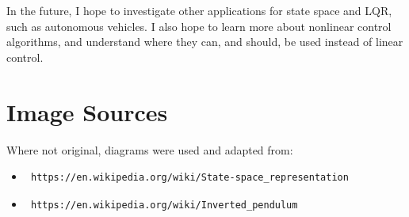 \documentclass[11pt]{article}
\begin{document}
In the future, I hope to investigate other applications for state space and LQR, such as autonomous vehicles. I also hope to learn more about nonlinear control algorithms, and understand where they can, and should, be used instead of linear control.

\printbibliography

\section*{Image Sources}

Where not original, diagrams were used and adapted from:

\begin{itemize}
\item \begin{verbatim} https://en.wikipedia.org/wiki/State-space_representation \end{verbatim}
\item \begin{verbatim} https://en.wikipedia.org/wiki/Inverted_pendulum \end{verbatim}
\end{itemize}
\end{document}
